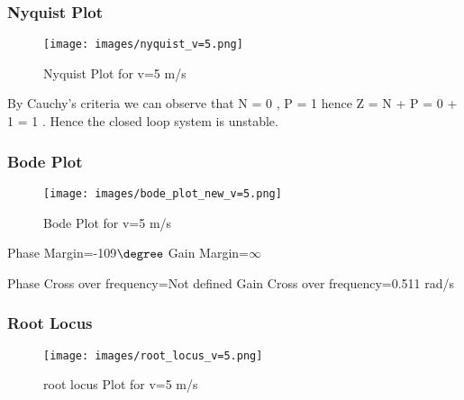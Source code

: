 \documentclass[notitlepage]{article}
\begin{document}
\subsubsection{Nyquist Plot}
\begin{figure}[h]
    \centering
    \texttt{[image: images/nyquist\_v=5.png]}
     \caption{Nyquist Plot for v=5 m/s}
     \label{fig:my_label}
 \end{figure}
 \small \noindent By Cauchy's criteria we can observe that N = 0 , P = 1 hence Z = N + P = 0 + 1 = 1 . Hence the closed loop system is unstable.

\newpage
\subsubsection{Bode Plot}
\begin{figure}[h]
    \centering
    \texttt{[image: images/bode\_plot\_new\_v=5.png]}
     \caption{Bode Plot for v=5 m/s}
     \label{fig:my_label}
 \end{figure}
Phase Margin=-109$\degree$  \hspace{30.5mm} Gain Margin=$\infty$

\vspace{1mm}
Phase Cross over frequency=Not defined \hspace{2mm} Gain Cross over frequency=0.511 rad/s
\newpage
\subsubsection{Root Locus}
\begin{figure}[h]
    \centering
    \texttt{[image: images/root\_locus\_v=5.png]}
    \caption{root locus Plot for v=5 m/s}
    \label{fig:my_label}
\end{figure}



\end{document}
